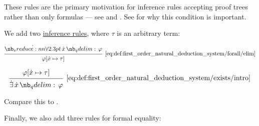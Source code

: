 \begin{definition}
\begin{thmenum}
    These rules are the primary motivation for inference rules accepting proof trees rather than only formulas --- see  and . See  for why this condition is important.

     We add two \hyperref[con:judgment/inference_rule]{inference rules}, where \( \tau \) is an arbitrary term:

    \begin{minipage}{0.45\textwidth}
      \begin{equation*}\taglabel[\ensuremath{ \synforall^- }]{eq:def:first_order_natural_deduction_system/forall/elim}
        \begin{prooftree}
          \hypo{ \qforall \synx \varphi }
          \infer1[\ref{eq:def:first_order_natural_deduction_system/forall/elim}]{ \varphi[\synx \mapsto \tau] }
        \end{prooftree}
      \end{equation*}
    \end{minipage}
    \hfill
    \begin{minipage}{0.45\textwidth}
      \begin{equation*}\taglabel[\ensuremath{ \synexists^+ }]{eq:def:first_order_natural_deduction_system/exists/intro}
        \begin{prooftree}
          \hypo{ \varphi[\synx \mapsto \tau] }
          \infer1[\ref{eq:def:first_order_natural_deduction_system/exists/intro}]{ \qexists \synx \varphi }
        \end{prooftree}
      \end{equation*}
    \end{minipage}

    Compare this to .

     Finally, we also add three rules for formal equality:


\end{thmenum}
\end{definition}
